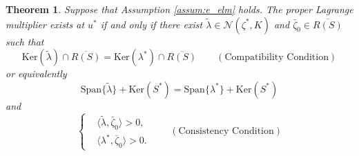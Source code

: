 \documentclass[10pt,a4paper]{amsart}
\newtheorem{theorem}{Theorem}
\begin{document}
\begin{theorem}\label{thm:pLM_exist}
Suppose that Assumption \ref{assum:e_elm} holds. The proper Lagrange multiplier exists at $u^*$ if and only if there exist  $\tilde{\lambda}\in \mathcal{N}(\zeta^*,K)$ and $\bar{\zeta}_0\in \overline{R(S)}$ such that
\begin{equation}\label{eq:LM_iff1}
 \mathrm{Ker}(\tilde{\lambda})\cap \overline{R(S)}=  \mathrm{Ker}(\lambda^*)\cap \overline{R(S)}\quad\quad (\mbox{Compatibility\ Condition})
 \end{equation}
 or equivalently
\begin{equation}\nonumber
\mathrm{Span}\{\tilde{\lambda}\} + \mathrm{Ker}(S^*) = \mathrm{Span}\{\lambda^*\} + \mathrm{Ker}(S^*)
 \end{equation}
and 
 \begin{equation}\label{eq:LM_iff2}
 \left\{
 \begin{aligned}
 & \langle\tilde{\lambda}, \bar{\zeta}_0 \rangle > 0,\\
 & \langle \lambda^*, \bar{\zeta}_0 \rangle > 0. 
 \end{aligned}
 \right.
 \quad\quad  (\mbox{Consistency\ Condition})
 \end{equation}
\end{theorem}
\end{document}
